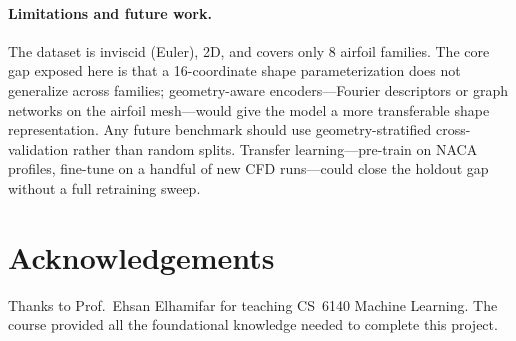 \documentclass[11pt]{article}
\begin{document}
\paragraph{Limitations and future work.}
The dataset is inviscid (Euler), 2D, and covers only 8 airfoil families.
The core gap exposed here is that a 16-coordinate shape parameterization
does not generalize across families; geometry-aware encoders---Fourier
descriptors or graph networks on the airfoil mesh---would give the model
a more transferable shape representation. Any future benchmark should use
geometry-stratified cross-validation rather than random splits. Transfer
learning---pre-train on NACA profiles, fine-tune on a handful of new CFD
runs---could close the holdout gap without a full retraining sweep.

\section*{Acknowledgements}
Thanks to Prof.\ Ehsan Elhamifar for teaching CS~6140 Machine Learning.
The course provided all the foundational knowledge needed to complete this project.

\clearpage


\end{document}
